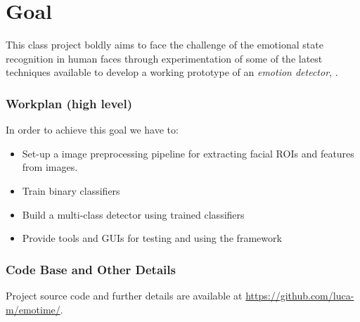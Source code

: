 \section{Goal}

This class project boldly aims to face the challenge of the emotional state recognition in human faces through experimentation of some of the latest techniques available to develop a working prototype of an \emph{emotion detector}, .\\

\subsubsection*{Workplan (high level)}

In order to achieve this goal we have to:

\begin{itemize}
\item Set-up a image preprocessing pipeline for extracting facial ROIs and features from images.
\item Train binary classifiers
\item Build a multi-class detector using trained classifiers
\item Provide tools and GUIs for testing and using the framework
\end{itemize}

\subsubsection*{Code Base and Other Details}

Project source code and further details are available at \url{https://github.com/luca-m/emotime/}.

\newpage